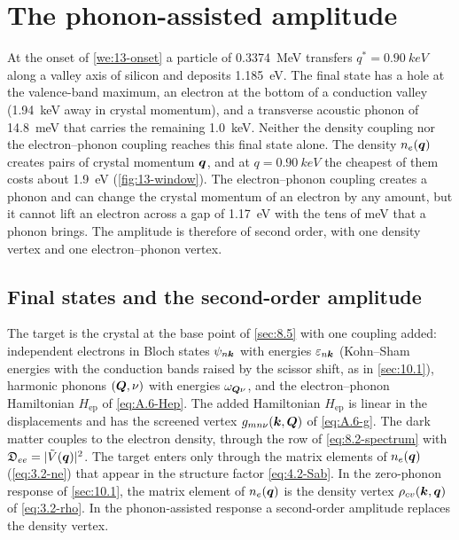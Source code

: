 \section{The phonon-assisted amplitude}\label{sec:13.2}

At the onset of \cref{we:13-onset} a particle of \SI{0.3374}{MeV} transfers $q^* = \SI{0.90}{keV}$ along a valley axis of silicon and deposits \SI{1.185}{eV}. The final state has a hole at the valence-band maximum, an electron at the bottom of a conduction valley (\SI{1.94}{keV} away in crystal momentum), and a transverse acoustic phonon of \SI{14.8}{meV} that carries the remaining \SI{1.0}{keV}. Neither the density coupling nor the electron--phonon coupling reaches this final state alone. The density $n_e(\bm{q})$ creates pairs of crystal momentum $\bm{q}$, and at $q = \SI{0.90}{keV}$ the cheapest of them costs about \SI{1.9}{eV} (\cref{fig:13-window}). The electron--phonon coupling creates a phonon and can change the crystal momentum of an electron by any amount, but it cannot lift an electron across a gap of \SI{1.17}{eV} with the tens of meV that a phonon brings. The amplitude is therefore of second order, with one density vertex and one electron--phonon vertex.

\subsection{Final states and the second-order amplitude}

The target is the crystal at the base point of \cref{sec:8.5} with one coupling added: independent electrons in Bloch states $\psi_{n\bm{k}}$ with energies $\varepsilon_{n\bm{k}}$ (Kohn--Sham energies with the conduction bands raised by the scissor shift, as in \cref{sec:10.1}), harmonic phonons $(\bm{Q},\nu)$ with energies $\omega_{\bm{Q}\nu}$, and the electron--phonon Hamiltonian $H_{\mathrm{ep}}$ of \cref{eq:A.6-Hep}. The added Hamiltonian $H_{\mathrm{ep}}$ is linear in the displacements and has the screened vertex $g_{mn\nu}(\bm{k},\bm{Q})$ of \cref{eq:A.6-g}. The dark matter couples to the electron density, through the row of \cref{eq:8.2-spectrum} with $\mathfrak{D}_{ee} = |\tilde V(\bm{q})|^2$. The target enters only through the matrix elements of $n_e(\bm{q})$ (\cref{eq:3.2-ne}) that appear in the structure factor \cref{eq:4.2-Sab}. In the zero-phonon response of \cref{sec:10.1}, the matrix element of $n_e(\bm{q})$ is the density vertex $\rho_{cv}(\bm{k},\bm{q})$ of \cref{eq:3.2-rho}. In the phonon-assisted response a second-order amplitude replaces the density vertex.

